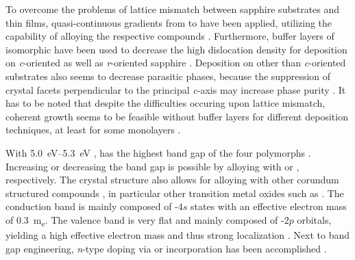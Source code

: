 To overcome the problems of lattice mismatch between sapphire substrates and \agao{} thin films, quasi-continuous gradients from  to \agao{} have been applied, utilizing the capability of alloying the respective compounds
    \cite{jinno2016}.
Furthermore, buffer layers of isomorphic  have been used to decrease the high dislocation density for deposition on \textit{c}-oriented
    \cite{stepanov2021,polyakov2022a}
as well as \textit{r}-oriented sapphire
    \cite{polyakov2022}.
Deposition on other than \textit{c}-oriented substrates also seems to decrease parasitic phases, because the suppression of crystal facets perpendicular to the principal \textit{c}-axis may increase phase purity
    \cite{jinno2021}.
It has to be noted that despite the difficulties occuring upon lattice mismatch, coherent growth seems to be feasible without buffer layers for different deposition techniques, at least for some monolayers
    \cite{schewski2015}.

With \qtyrange{5.0}{5.3}{\eV}
    \cite{yang2022},
\agao{} has the highest band gap of the four polymorphs
    \cite{pearton2018}.
Increasing or decreasing the band gap is possible by alloying with 
    \cite{jinno2021}
or 
    \cite{hassa2020},
respectively.
The crystal structure also allows for alloying with other corundum structured compounds
    \cite{yang2022},
in particular other transition metal oxides such as 
    \cite{polyakov2022,polyakov2022a}.
The conduction band is mainly composed of -$4s$ states with an effective electron mass of \qty{0.3}{m_e}.
The valence band is very flat and mainly composed of -$2p$ orbitals, yielding a high effective electron mass and thus strong localization
    \cite{pearton2018}.
Next to band gap engineering, \textit{n}-type doping via  or  incorporation has been accomplished
    \cite{yang2022}.
